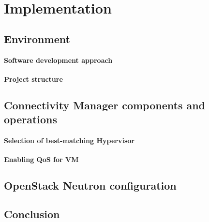 \chapter{Implementation}


\section{Environment}

\subsubsection{Software development approach}

\subsubsection{Project structure}

\section{Connectivity Manager components and operations}

\subsubsection{Selection of best-matching Hypervisor}

\subsubsection{Enabling QoS for VM}

\section{OpenStack Neutron configuration}

\section{Conclusion}